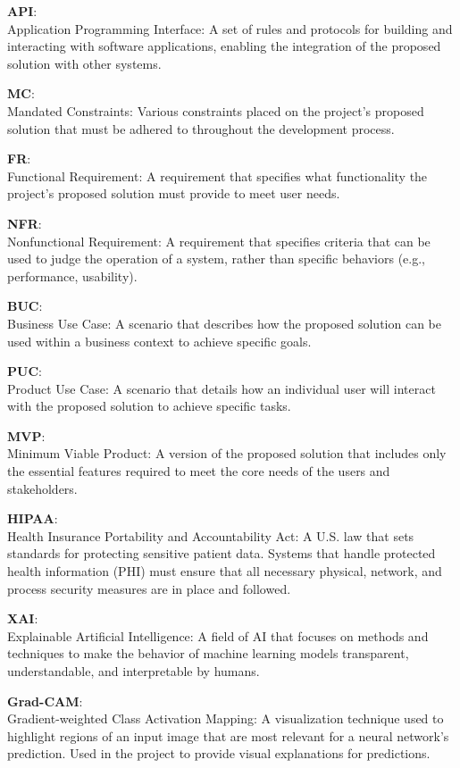 \documentclass[12pt]{article}
\begin{document}
\textbf{API}:\\
Application Programming Interface: A set of rules and protocols for building and interacting with software applications, enabling the integration of the proposed solution with other systems.

\textbf{MC}:\\
Mandated Constraints: Various constraints placed on the project's proposed solution that must be adhered to throughout the development process.

\textbf{FR}:\\
Functional Requirement: A requirement that specifies what functionality the project's proposed solution must provide to meet user needs.

\textbf{NFR}:\\
Nonfunctional Requirement: A requirement that specifies criteria that can be used to judge the operation of a system, rather than specific behaviors (e.g., performance, usability).

\textbf{BUC}:\\
Business Use Case: A scenario that describes how the proposed solution can be used within a business context to achieve specific goals.

\textbf{PUC}:\\
Product Use Case: A scenario that details how an individual user will interact with the proposed solution to achieve specific tasks.

\textbf{MVP}:\\
Minimum Viable Product: A version of the proposed solution that includes only the essential features required to meet the core needs of the users and stakeholders.

\textbf{HIPAA}:\\
Health Insurance Portability and Accountability Act: A U.S. law that sets standards for protecting sensitive patient data. Systems that handle protected health information (PHI) must ensure that all necessary physical, network, and process security measures are in place and followed.

\textbf{XAI}:\\
Explainable Artificial Intelligence: A field of AI that focuses on methods and techniques to make the behavior of machine learning models transparent, understandable, and interpretable by humans.

\textbf{Grad-CAM}:\\
Gradient-weighted Class Activation Mapping: A visualization technique used to highlight regions of an input image that are most relevant for a neural network's prediction. Used in the project to provide visual explanations for predictions.
\end{document}
